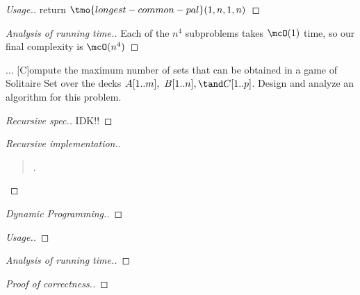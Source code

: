 \documentclass{article}
\begin{document}
\begin{proof}[Usage.]
  return $ \tmo{longest-common-pal}(1,n,1,n) $
\end{proof}

\begin{proof}[Analysis of running time.]
  Each of the $ n^4 $ subproblems takes $ \mcO(1) $ time, so our final complexity is $ \mcO(n^4) $
\end{proof}
\pagebreak

\setcounter{exercise}{9}
\begin{exercise}
  ... [C]ompute the maximum number of sets that can be obtained
  in a game of Solitaire Set over the decks $A[1..m],\ B[1..n],\tand C[1..p]$. Design and analyze an algorithm for this problem.
\end{exercise}

\begin{proof}[Recursive spec.]
IDK!!
\end{proof}

\begin{proof}[Recursive implementation.]\
\begin{quote}
\begin{steps}
  \item .
\end{steps}
\end{quote}
\end{proof}

\begin{proof}[Dynamic Programming.]

\end{proof}

\begin{proof}[Usage.]

\end{proof}

\begin{proof}[Analysis of running time.]

\end{proof}

\begin{proof}[Proof of correctness.]

\end{proof}
\end{document}

